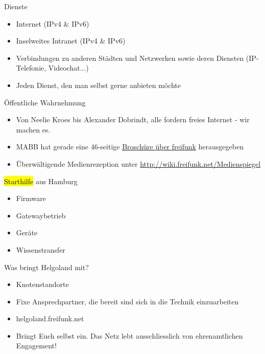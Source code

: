 \documentclass[t]{beamer}
\begin{document}
\begin{frame}{Dienste}
	\begin{itemize}
		\item Internet (IPv4 \& IPv6)
		\item Inselweites Intranet (IPv4 \& IPv6)
		\item Verbindungen zu anderen Städten und Netzwerken sowie deren Diensten (IP-Telefonie, Videochat...)
		\item Jeden Dienst, den man selbst gerne anbieten möchte
	\end{itemize}
\end{frame}

\begin{frame}{Öffentliche Wahrnehmung}
	\begin{itemize}
		\item Von Neelie Kroes bis Alexander Dobrindt, alle fordern freies Internet - wir machen es.
		\item MABB hat gerade eine 46-seitige \href{http://mabb.de/presse/pressemitteilungen/details/wlan-fuer-alle-freie-funknetze-in-der-praxis.html}{Broschüre über freifunk} herausgegeben 
		\item Überwältigende Medienrezeption unter \href{http://wiki.freifunk.net/Medienspiegel}{http://wiki.freifunk.net/Medienspiegel}
	\end{itemize}
\end{frame}

\begin{frame}{\hl{Starthilfe} aus Hamburg}
	\begin{itemize}
		\item Firmware
		\item Gatewaybetrieb
		\item Geräte
		\item Wissenstransfer
	\end{itemize}
\end{frame}


\begin{frame}{Was bringt Helgoland mit?}
	\begin{itemize}
		\item Knotenstandorte
		\item Fixe Ansprechpartner, die bereit sind sich in die Technik einzuarbeiten
		\item helgoland.freifunk.net
		\item Bringt Euch selbst ein. Das Netz lebt ausschliesslich von ehrenamtlichen Engagement!
	\end{itemize}
\end{frame}
\end{document}
